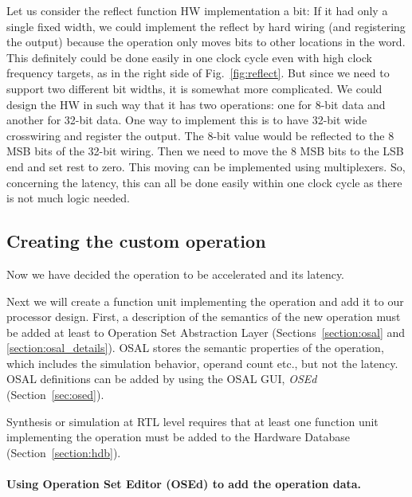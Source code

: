 \documentclass[a4paper,twoside]{tceusermanual}
\begin{document}
Let us consider the reflect function HW implementation a bit: If it had
only a single fixed width, we could implement the reflect by hard
wiring (and registering the output)
because the operation only moves bits to other locations in the
word. This definitely could be done easily in one clock cycle even with
high clock frequency targets, as in the right side
of Fig.~\ref{fig:reflect}. But since we need to support two different bit widths,
it is somewhat more complicated. We could design the HW in such way that
it has two operations: one for 8-bit data and another for 32-bit
data. One way to implement this is to have 32-bit wide crosswiring and
register the output. The 8-bit value would be reflected to the 8 MSB
bits of the 32-bit wiring. Then we need to move the 8 MSB bits to the
LSB end and set rest to zero. This moving can be implemented using
multiplexers. So, concerning the latency, this can all be done easily
within one clock cycle as there is not much logic needed.


\subsection{Creating the custom operation}
\label{section:customOperations}

Now we have decided the operation to be accelerated and its latency.

Next we will create a function unit implementing the
operation and add it to our processor design. First, a description of
the semantics of the new operation must be added at least to Operation
Set Abstraction Layer (Sections~\ref{section:osal} and
\ref{section:osal_details}). OSAL stores the semantic properties of
the operation, which includes the simulation behavior, operand count
etc., but not the latency. OSAL definitions can be added by using the
OSAL GUI, \emph{OSEd} (Section~\ref{sec:osed}).

Synthesis or simulation at RTL level requires that at least one
function unit implementing the operation must be added to the Hardware
Database (Section~\ref{section:hdb}).


\paragraph{Using Operation Set Editor (OSEd) to add the operation data.}
\end{document}
